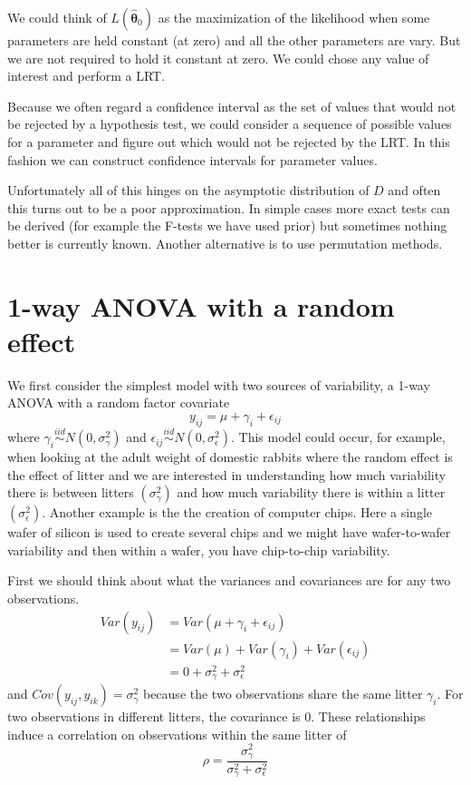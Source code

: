 \documentclass[]{book}
\theoremstyle{definition}
\theoremstyle{definition}
\theoremstyle{remark}
\begin{document}
We could think of \(L\left(\hat{\boldsymbol{\theta}}_{0}\right)\) as the
maximization of the likelihood when some parameters are held constant
(at zero) and all the other parameters are vary. But we are not required
to hold it constant at zero. We could chose any value of interest and
perform a LRT.

Because we often regard a confidence interval as the set of values that
would not be rejected by a hypothesis test, we could consider a sequence
of possible values for a parameter and figure out which would not be
rejected by the LRT. In this fashion we can construct confidence
intervals for parameter values.

Unfortunately all of this hinges on the asymptotic distribution of \(D\)
and often this turns out to be a poor approximation. In simple cases
more exact tests can be derived (for example the F-tests we have used
prior) but sometimes nothing better is currently known. Another
alternative is to use permutation methods.

\section{1-way ANOVA with a random
effect}\label{way-anova-with-a-random-effect}

We first consider the simplest model with two sources of variability, a
1-way ANOVA with a random factor covariate
\[y_{ij}=\mu+\gamma_{i}+\epsilon_{ij}\] where
\(\gamma_{i}\stackrel{iid}{\sim}N\left(0,\sigma_{\gamma}^{2}\right)\)
and
\(\epsilon_{ij}\stackrel{iid}{\sim}N\left(0,\sigma_{\epsilon}^{2}\right)\).
This model could occur, for example, when looking at the adult weight of
domestic rabbits where the random effect is the effect of litter and we
are interested in understanding how much variability there is between
litters \(\left(\sigma_{\gamma}^{2}\right)\) and how much variability
there is within a litter \(\left(\sigma_{\epsilon}^{2}\right)\). Another
example is the the creation of computer chips. Here a single wafer of
silicon is used to create several chips and we might have wafer-to-wafer
variability and then within a wafer, you have chip-to-chip variability.

First we should think about what the variances and covariances are for
any two observations. \[\begin{aligned}
  Var\left(y_{ij}\right)    
   &=   Var\left(\mu+\gamma_{i}+\epsilon_{ij}\right) \\
     &= Var\left(\mu\right)+Var\left(\gamma_{i}\right)+Var\left(\epsilon_{ij}\right) \\
     &= 0+\sigma_{\gamma}^{2}+\sigma_{\epsilon}^{2} 
     \end{aligned}\] and
\(Cov\left(y_{ij},y_{ik}\right)=\sigma_{\gamma}^{2}\) because the two
observations share the same litter \(\gamma_{i}\). For two observations
in different litters, the covariance is 0. These relationships induce a
correlation on observations within the same litter of
\[\rho=\frac{\sigma_{\gamma}^{2}}{\sigma_{\gamma}^{2}+\sigma_{\epsilon}^{2}}\]
\end{document}
